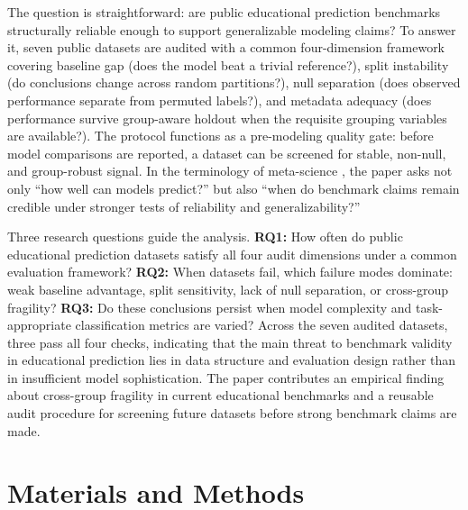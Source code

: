 \documentclass[10pt,letterpaper]{wlscirep}
\begin{document}
The question is straightforward: are public educational prediction benchmarks structurally reliable enough to support generalizable modeling claims? To answer it, seven public datasets are audited with a common four-dimension framework covering baseline gap (does the model beat a trivial reference?), split instability (do conclusions change across random partitions?), null separation (does observed performance separate from permuted labels?), and metadata adequacy (does performance survive group-aware holdout when the requisite grouping variables are available?). The protocol functions as a pre-modeling quality gate: before model comparisons are reported, a dataset can be screened for stable, non-null, and group-robust signal. In the terminology of meta-science \citep{Ioannidis2005}, the paper asks not only ``how well can models predict?'' but also ``when do benchmark claims remain credible under stronger tests of reliability and generalizability?''

Three research questions guide the analysis. \textbf{RQ1:} How often do public educational prediction datasets satisfy all four audit dimensions under a common evaluation framework? \textbf{RQ2:} When datasets fail, which failure modes dominate: weak baseline advantage, split sensitivity, lack of null separation, or cross-group fragility? \textbf{RQ3:} Do these conclusions persist when model complexity and task-appropriate classification metrics are varied? Across the seven audited datasets, three pass all four checks, indicating that the main threat to benchmark validity in educational prediction lies in data structure and evaluation design rather than in insufficient model sophistication. The paper contributes an empirical finding about cross-group fragility in current educational benchmarks and a reusable audit procedure for screening future datasets before strong benchmark claims are made.

\section{Materials and Methods}
\end{document}
